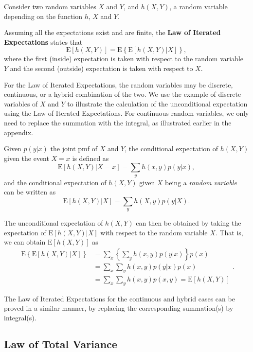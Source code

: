 \documentclass[]{book}
\theoremstyle{definition}
\theoremstyle{definition}
\theoremstyle{definition}
\theoremstyle{remark}
\begin{document}
Consider two random variables \(X\) and \(Y\), and \(h(X,Y)\), a random
variable depending on the function \(h\), \(X\) and \(Y\).

Assuming all the expectations exist and are finite, the \textbf{Law of
Iterated Expectations} states that
\[\mathrm{E}[h(X,Y)]= \mathrm{E} \left\{ \mathrm{E} \left[ h(X,Y) | X \right] \right \},\]
where the first (inside) expectation is taken with respect to the random
variable \(Y\) and the second (outside) expectation is taken with
respect to \(X\).

For the Law of Iterated Expectations, the random variables may be
discrete, continuous, or a hybrid combination of the two. We use the
example of discrete variables of \(X\) and \(Y\) to illustrate the
calculation of the unconditional expectation using the Law of Iterated
Expectations. For continuous random variables, we only need to replace
the summation with the integral, as illustrated earlier in the appendix.

Given \(p(y|x)\) the joint pmf of \(X\) and \(Y\), the conditional
expectation of \(h(X,Y)\) given the event \(X=x\) is defined as
\[\mathrm{E} \left[ h(X,Y) | X=x \right] = \sum_y h(x,y) p(y|x),\] and
the conditional expectation of \(h(X,Y)\) given \(X\) being a
\emph{random variable} can be written as
\[\mathrm{E} \left[ h(X,Y) | X \right] = \sum_y h(X,y) p(y|X).\]

The unconditional expectation of \(h(X,Y)\) can then be obtained by
taking the expectation of \(\mathrm{E} \left[ h(X,Y) | X \right]\) with
respect to the random variable \(X\). That is, we can obtain
\(\mathrm{E}[ h(X,Y)]\) as \[\begin{aligned}
     \mathrm{E} \left\{ \mathrm{E} \left[ h(X,Y) | X \right] \right \}
    &= \sum_x  \left\{\sum_y h(x,y) p(y|x) \right \} p(x) \\
    &= \sum_x  \sum_y h(x,y) p(y|x)p(x) \\
    &=  \sum_x  \sum_y h(x,y) p(x,y)
    =  \mathrm{E}[h(X,Y)] \end{aligned}.\]

The Law of Iterated Expectations for the continuous and hybrid cases can
be proved in a similar manner, by replacing the corresponding
summation(s) by integral(s).

\subsection{Law of Total Variance}\label{law-of-total-variance}
\end{document}
